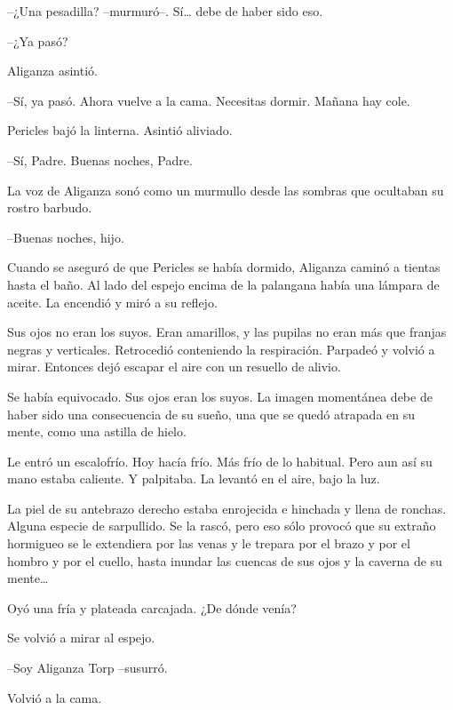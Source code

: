 --¿Una pesadilla? --murmuró--. Sí… debe de haber sido eso.

--¿Ya pasó?

Aliganza asintió.

--Sí, ya pasó. Ahora vuelve a la cama. Necesitas dormir. Mañana hay cole.

Pericles bajó la linterna. Asintió aliviado.

--Sí, Padre. Buenas noches, Padre.

La voz de Aliganza sonó como un murmullo desde las sombras que ocultaban su rostro barbudo.

--Buenas noches, hijo.



\mbox{}

\centerline{ \Huge *}

\mbox{}



Cuando se aseguró de que Pericles se había dormido, Aliganza caminó a tientas hasta el baño. Al lado del espejo encima de la palangana había una lámpara de aceite. La encendió y miró a su reflejo.

Sus ojos no eran los suyos. Eran amarillos, y las pupilas no eran más que franjas negras y verticales. Retrocedió conteniendo la respiración. Parpadeó y volvió a mirar. Entonces dejó escapar el aire con un resuello de alivio.

Se había equivocado. Sus ojos eran los suyos. La imagen momentánea debe de haber sido una consecuencia de su sueño, una que se quedó atrapada en su mente, como una astilla de hielo.

Le entró un escalofrío. Hoy hacía frío. Más frío de lo habitual. Pero aun así su mano estaba caliente. Y palpitaba. La levantó en el aire, bajo la luz.

La piel de su antebrazo derecho estaba enrojecida e hinchada y llena de ronchas. Alguna especie de sarpullido. Se la rascó, pero eso sólo provocó que su extraño hormigueo se le extendiera por las venas y le trepara por el brazo y por el hombro y por el cuello, hasta inundar las cuencas de sus ojos y la caverna de su mente…

Oyó una fría y plateada carcajada. ¿De dónde venía?

Se volvió a mirar al espejo.

--Soy Aliganza Torp --susurró.

Volvió a la cama.


